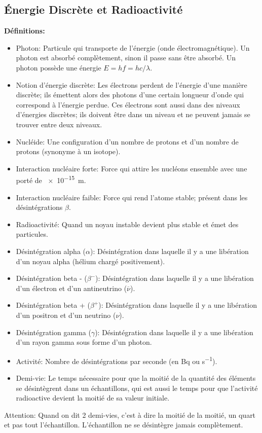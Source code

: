 \documentclass[french, a4paper, 12pt]{article}
\begin{document}
\subsection{Énergie Discrète et Radioactivité}
\textbf{Définitions:}
\begin{itemize}
\item Photon: Particule qui transporte de l'énergie (onde électromagnétique). Un photon est absorbé complètement, sinon il passe sans être absorbé. Un photon possède une énergie $E=hf=hc/\lambda$.
\item Notion d'énergie discrète: Les électrons perdent de l'énergie d'une manière discrète; ils émettent alors des photons d'une certain longueur d'onde qui correspond à l'énergie perdue. Ces électrons sont aussi dans des niveaux d'énergies discrètes; ils doivent être dans un niveau et ne peuvent jamais se trouver entre deux niveaux.
\item Nucléide: Une configuration d'un nombre de protons et d'un nombre de protons (synonyme à un isotope).
\item Interaction nucléaire forte: Force qui attire les nucléons ensemble avec une porté de \SI{e-15}{m}.
\item Interaction nucléaire faible: Force qui rend l'atome stable; présent dans les désintégrations $\beta$.
\item Radioactivité: Quand un noyau instable devient plus stable et émet des particules.
\item Désintégration alpha ($\alpha$): Désintégration dans laquelle il y a une libération d'un noyau alpha (hélium chargé positivement).
\item Désintégration beta - ($\beta ^-$): Désintégration dans laquelle il y a une libération d'un électron et d'un antineutrino ($\overline{\nu}$).
\item Désintégration beta + ($\beta ^+$): Désintégration dans laquelle il y a une libération d'un positron et d'un neutrino ($\nu$).
\item Désintégration gamma ($\gamma$): Désintégration dans laquelle il y a une libération d'un rayon gamma sous forme d'un photon.
\item Activité: Nombre de désintégrations par seconde (en \si{Bq} ou \si{s^{-1}}).
\item Demi-vie: Le temps nécessaire pour que la moitié de la quantité des éléments se désintègrent dans un échantillons, qui est aussi le temps pour que l'activité radioactive devient la moitié de sa valeur initiale.
\end{itemize}
Attention: Quand on dit 2 demi-vies, c'est à dire la moitié de la moitié, un quart et pas tout l'échantillon. L'échantillon ne se désintègre jamais complètement.
\end{document}
